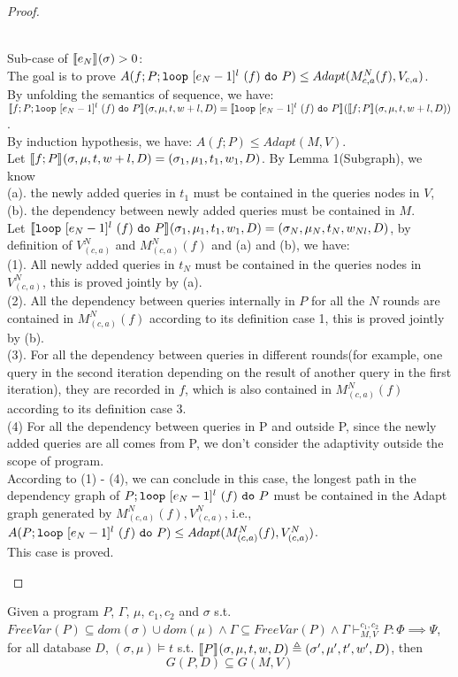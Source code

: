 \documentclass[a4paper,11pt]{article}
\begin{document}
\begin{proof}
\begin{itemize}
\\
Sub-case of $\llbracket e_N\rrbracket_{}(\sigma) > 0$:
\\
The goal is to prove 
$A(f;P; \mathtt{loop} ~ [e_N-1]^{l} ~ (f) ~ \mathtt{do} ~ P) \leq 
Adapt(M_{c,a}^N(f), V_{c, a})$.
\\
By unfolding the semantics of sequence, we have:
\\
$\llbracket f;P; \mathtt{loop} ~ [e_N-1]^{l} ~ (f) ~ \mathtt{do} ~ P \rrbracket_{} (\sigma , \mu, t, w + l, D) 
= \llbracket\mathtt{loop} ~ [e_N-1]^{l} ~ (f) ~ \mathtt{do} ~ P \rrbracket_{ }
(\llbracket f;P\rrbracket_{} (\sigma , \mu, t, w + l, D))$.
\\
By induction hypothesis, we have:
$A(f;P) \leq Adapt(M, V)$.
%
\\
Let $\llbracket f;P\rrbracket_{} (\sigma , \mu, t, w + l, D) 
= (\sigma_1 , \mu_1, t_1, w_1, D)$.  
By Lemma 1(Subgraph),
we know 
\\
(a). the newly added queries in $t_1$ must be contained in the queries nodes in $V$,
\\
(b). the dependency between newly added queries must be contained in $M$.
\\
Let $\llbracket\mathtt{loop} ~ [e_N-1]^{l} ~ (f) ~ \mathtt{do} ~ P \rrbracket_{} (\sigma_1 , \mu_1, t_1, w_1, D) 
= (\sigma_N , \mu_N, t_N, w_{Nl}, D) $, by definition of $V^N_{(c, a)}$ and $M^N_{(c, a)}(f)$ and (a) and (b), we have:
\\
(1). All newly added queries in $t_N$ must be contained in the queries nodes in $V^N_{(c, a)}$, this is proved jointly by (a).
\\
(2). All the dependency between queries internally in $P$ for all the $N$ rounds are contained in $M^N_{(c, a)}(f)$ according to its definition case 1, this is proved jointly by (b).
\\
(3). For all the dependency between queries in different rounds(for example, one query in the second iteration depending on the result of another query in the first iteration), 
they are recorded in $f$,
which is also contained in $M^N_{(c, a)}(f)$ according to its definition case 3.
\\
(4) For all the dependency between queries in P and outside P, since the newly added queries are all comes from P, 
we don't consider the adaptivity outside the scope of program.
\\
According to (1) - (4), we
can conclude in this case, the longest path in the dependency graph of 
$P; \mathtt{loop} ~ [e_N-1]^{l} ~ (f) ~ \mathtt{do} ~ P$ must be contained in the
Adapt graph generated by 
$M^N_{(c, a)}(f), V^N_{(c, a)} $, i.e., 
$A(P; \mathtt{loop} ~ [e_N-1]^{l} ~ (f) ~ \mathtt{do} ~ P) \leq Adapt(M^N_{(c, a)}(f), V^N_{(c, a)} )$.
\\
This case is proved.
%
\end{itemize}
\end{proof}
%
%
\begin{lem}
[Subgraph]
Given a program $P$, $\Gamma$, $\mu$, $c_1, c_2$ and $\sigma$ s.t. $
FreeVar(P) \subseteq dom(\sigma) \cup dom(\mu)  
\land \Gamma \subseteq FreeVar(P) 
\land \Gamma \vdash_{M,V}^{c_1,c_2} P: \Phi \implies \Psi$,
 for all database $D$, $(\sigma, \mu) \vDash t$ s.t. 
$\llbracket P \rrbracket_{} (\sigma, \mu , t ,w , D)  \triangleq  (\sigma' , \mu' , t', w' , D)$,
then
\[
G(P,D) \subseteq G(M, V)
\]
\end{lem}
\end{document}

